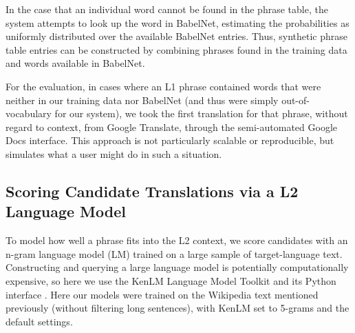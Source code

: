 \documentclass[11pt,a4paper]{article}
\begin{document}
In the case that an individual word cannot be found in the phrase table, the
system attempts to look up the word in BabelNet, estimating the probabilities
as uniformly distributed over the available BabelNet entries. Thus,
synthetic phrase table entries can be constructed by combining phrases found in
the training data and words available in BabelNet.

For the evaluation, in cases where an L1 phrase contained words that were
neither in our training data nor BabelNet (and thus were simply
out-of-vocabulary for our system), we took the first translation for that
phrase, without regard to context, from Google Translate, through the
semi-automated Google Docs interface. This approach is not particularly
scalable or reproducible, but simulates what a user might do in such a
situation.



\subsection{Scoring Candidate Translations via a L2 Language Model}
\label{sec:l2model}

To model how well a phrase fits into the L2 context, we score candidates 
with an n-gram language model (LM) trained on a large sample of
target-language text.
Constructing and querying a large language model is potentially computationally
expensive, so here we use the KenLM Language Model Toolkit and its Python
interface \cite{heafield:kenlm:11}. Here our models were trained on the
Wikipedia text mentioned previously (without filtering long sentences), with
KenLM set to 5-grams and the default settings.
\end{document}
